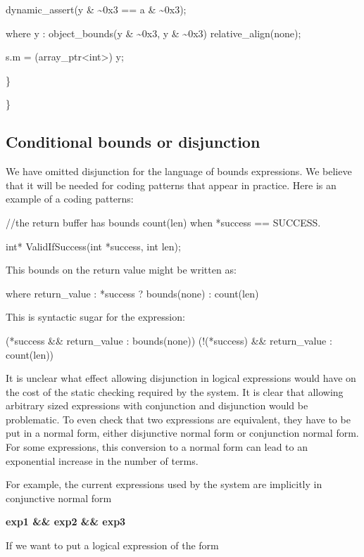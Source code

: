 \documentclass[]{article}
\begin{document}
dynamic\_assert(y \& \textasciitilde{}0x3 == a \& \textasciitilde{}0x3);

where y : object\_bounds(y \& \textasciitilde{}0x3, y \&
\textasciitilde{}0x3) relative\_align(none);

s.m = (array\_ptr\textless{}int\textgreater{}) y;

\}

\}

\subsection{\texorpdfstring{\protect\hypertarget{ux5fToc437460844}{}{\protect\hypertarget{ux5fToc440445525}{}{\protect\hypertarget{ux5fToc440449307}{}{\protect\hypertarget{ux5fToc440551957}{}{}}}}Conditional
bounds or
disjunction}{Conditional bounds or disjunction}}\label{conditional-bounds-or-disjunction}

We have omitted disjunction for the language of bounds expressions. We
believe that it will be needed for coding patterns that appear in
practice. Here is an example of a coding patterns:

//the return buffer has bounds count(len) when *success == SUCCESS.

int* ValidIfSuccess(int *success, int len);

This bounds on the return value might be written as:

where return\_value : *success ? bounds(none) : count(len)

This is syntactic sugar for the expression:

(*success \&\& return\_value : bounds(none)) \textbar{}\textbar{}
(!(*success) \&\& return\_value : count(len))

It is unclear what effect allowing disjunction in logical expressions
would have on the cost of the static checking required by the system. It
is clear that allowing arbitrary sized expressions with conjunction and
disjunction would be problematic. To even check that two expressions are
equivalent, they have to be put in a normal form, either disjunctive
normal form or conjunction normal form. For some expressions, this
conversion to a normal form can lead to an exponential increase in the
number of terms.

For example, the current expressions used by the system are implicitly
in conjunctive normal form

\textbf{exp1 \&\& exp2 \&\& exp3}

If we want to put a logical expression of the form
\end{document}

